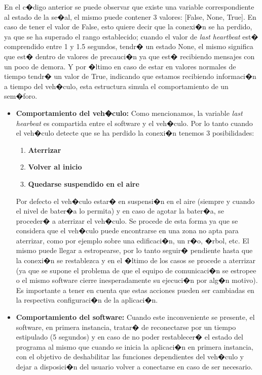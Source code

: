 En el c�digo anterior se puede observar que existe una variable correspondiente al estado de la se�al, el mismo puede contener 3 valores: [False, None, True]. En caso de tener el valor de False, esto quiere decir que la conexi�n se ha perdido, ya que se ha superado el rango establecido; cuando el valor de \textit{last heartbeat} est� comprendido entre 1 y 1.5 segundos, tendr� un estado None, el mismo significa que est� dentro de valores de precauci�n ya que est� recibiendo mensajes con un poco de demora. Y por �ltimo en caso de estar en valores normales de tiempo tendr� un valor de True, indicando que estamos recibiendo informaci�n a tiempo del veh�culo, esta estructura simula el comportamiento de un sem�foro. 


\begin{itemize}
	\item \textbf{Comportamiento del veh�culo: } Como mencionamos, la variable \textit{last hearbeat} es compartida entre el software y el veh�culo. Por lo tanto cuando el veh�culo detecte que se ha perdido la conexi�n tenemos 3 posibilidades:
	\begin{enumerate}
		\item \textbf{Aterrizar}						
		\item \textbf{Volver al inicio}
		\item \textbf{Quedarse suspendido en el aire}
	\end{enumerate}
	
	Por defecto el veh�culo estar� en suspensi�n en el aire (siempre y cuando el nivel de bater�a lo permita) y en caso de agotar la bater�a, se proceder� a aterrizar el veh�culo. Se procede de esta forma ya que se considera que el veh�culo puede encontrarse en una zona no apta para aterrizar, como por ejemplo sobre una edificaci�n, un r�o, �rbol, etc. El mismo puede llegar a estropearse, por lo tanto seguir� pendiente hasta que la conexi�n se restablezca y en el �ltimo de los casos se procede a aterrizar (ya que se supone el problema de que el equipo de comunicaci�n se estropee o el mismo software cierre inesperadamente su ejecuci�n por alg�n motivo). Es importante a tener en cuenta que estas acciones pueden ser cambiadas en la respectiva configuraci�n de la aplicaci�n. 
	
	\item \textbf{Comportamiento del software: } Cuando este inconveniente se presente, el software, en primera instancia, tratar� de reconectarse por un tiempo estipulado (5 segundos)  y en caso de no poder restablecer� el estado del programa al mismo que cuando se inicia la aplicaci�n en primera instancia, con el objetivo de deshabilitar las funciones dependientes del veh�culo y dejar a disposici�n del usuario volver a conectarse en caso de ser necesario. 
\end{itemize}  


